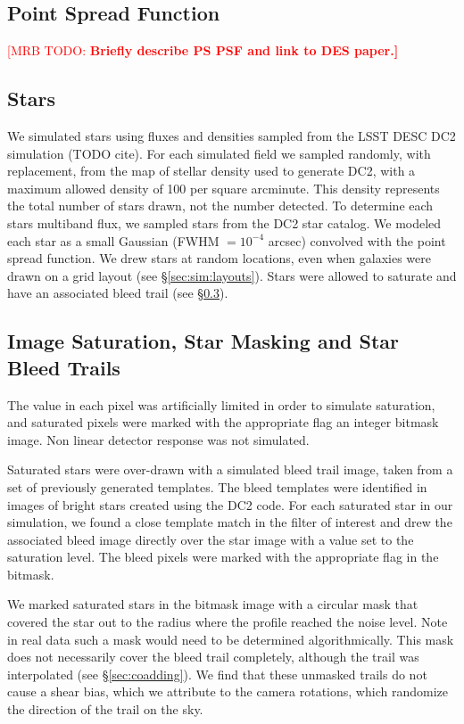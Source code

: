\documentclass[iop, twocolappendix, appendixfloats, numberedappendix, apj]{hackemulateapj}
\newcommand{\mattodo}[1]{\textcolor{red}{[MRB TODO: \bf #1]}}
\begin{document}
\subsection{Point Spread Function} \label{sec:sim:psfs}

\mattodo{Briefly describe PS PSF and link to DES paper.}

\subsection{Stars} \label{sec:sim:stars}

We simulated stars using fluxes and densities sampled from the LSST DESC DC2
simulation (TODO cite).  For each simulated field we sampled randomly, with
replacement, from the map of stellar density used to generate DC2, with a
maximum allowed density of 100 per square arcminute.  This density represents
the total number of stars drawn, not the number detected.  To determine each
stars multiband flux, we sampled stars from the DC2 star catalog.  We modeled
each star as a small Gaussian (FWHM $= 10^{-4}$ arcsec) convolved with the
point spread function.  We drew stars at random locations, even when galaxies
were drawn on a grid layout (see \S \ref{sec:sim:layouts}).  Stars were allowed
to saturate and have an associated bleed trail (see
\S \ref{sec:sim:satbleeds}).

\subsection{Image Saturation, Star Masking and Star Bleed Trails} \label{sec:sim:satbleeds}

The value in each pixel was artificially limited in order to simulate
saturation, and saturated pixels were marked with the appropriate flag an
integer bitmask image.  Non linear detector response was not simulated.

Saturated stars were over-drawn with a simulated bleed trail image, taken from
a set of previously generated templates.  The bleed templates were identified
in images of bright stars created using the DC2 code.  For each saturated star
in our simulation, we found a close template match in the filter of interest
and drew the associated bleed image directly over the star image with a value
set to the saturation level. The bleed pixels were marked with the appropriate
flag in the bitmask.

We marked saturated stars in the bitmask image with a circular mask that
covered the star out to the radius where the profile reached the noise level.
Note in real data such a mask would need to be determined algorithmically.
This mask does not necessarily cover the bleed trail completely, although the
trail was interpolated (see \S \ref{sec:coadding}).  We find that these
unmasked trails do not cause a shear bias, which we attribute to the
camera rotations, which randomize the direction of the trail on the sky.
\end{document}
